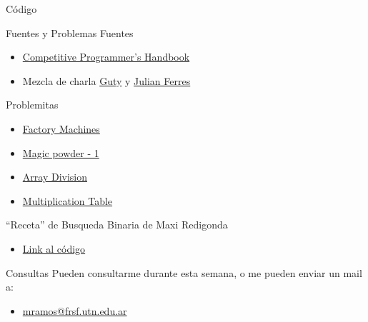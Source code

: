 \documentclass{beamer}
\begin{document}
\begin{frame}{Código}
	\ventanaDeslizanteDOSSUM
\end{frame}



\begin{frame}{Fuentes y Problemas}
    Fuentes
    \begin{itemize}
        \item \href{https://cses.fi/book/book.pdf}{Competitive Programmer's Handbook}
        \item Mezcla de charla \href{https://www.pc-arg.com/media/attachment/binary_twopointers.pdf}{Guty} y \href{https://www.pc-arg.com/media/attachment/bs-sorting-2022.pdf}{Julian Ferres}
    \end{itemize}
    Problemitas
    \begin{itemize}
        \item \href{https://cses.fi/problemset/task/1620}{Factory Machines}
        \item \href{https://codeforces.com/problemset/problem/670/D1}{Magic powder - 1}
        \item \href{https://cses.fi/problemset/task/1085}{Array Division}
        \item \href{https://cses.fi/problemset/task/2422}{Multiplication Table}
    \end{itemize}
    ``Receta'' de Busqueda Binaria de Maxi Redigonda
    \begin{itemize}
        \item \href{https://gist.github.com/mredigonda/6bbecf15a60373259c27f3b405de9773}{Link al código}
    \end{itemize}

\end{frame}


\begin{frame}{Consultas}
Pueden consultarme durante esta semana, o me pueden enviar un mail a:
        \begin{itemize}
            \item \href{mailto:mramos@frsf.utn.edu.ar}{mramos@frsf.utn.edu.ar}
        \end{itemize}
\end{frame}
\end{document}
